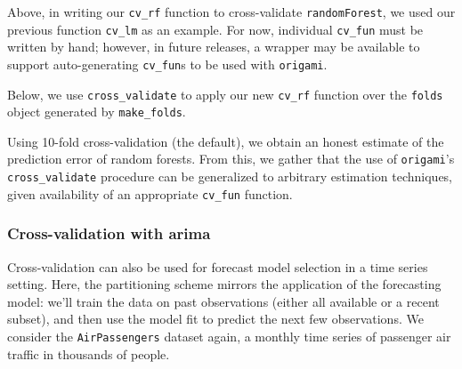\documentclass[12pt, krantz2,]{krantz}
\newenvironment{Shaded}{\begin{snugshade}}{\end{snugshade}}
\newcommand{\CommentTok}[1]{\textcolor[rgb]{0.37,0.37,0.37}{\textit{#1}}}
\newcommand{\DataTypeTok}[1]{\textcolor[rgb]{0.27,0.27,0.27}{#1}}
\newcommand{\KeywordTok}[1]{\textcolor[rgb]{0.27,0.27,0.27}{\textbf{#1}}}
\newcommand{\NormalTok}[1]{#1}
\newcommand{\OperatorTok}[1]{\textcolor[rgb]{0.43,0.43,0.43}{\textbf{#1}}}
\newcommand{\OtherTok}[1]{\textcolor[rgb]{0.37,0.37,0.37}{#1}}
\newcommand{\StringTok}[1]{\textcolor[rgb]{0.5,0.5,0.5}{#1}}
\theoremstyle{definition}
\theoremstyle{definition}
\theoremstyle{definition}
\newcommand{\1}{\mathbbm{1}}
\begin{document}
Above, in writing our \texttt{cv\_rf} function to cross-validate \texttt{randomForest}, we used
our previous function \texttt{cv\_lm} as an example. For now, individual \texttt{cv\_fun} must
be written by hand; however, in future releases, a wrapper may be available to
support auto-generating \texttt{cv\_fun}s to be used with \texttt{origami}.

Below, we use \texttt{cross\_validate} to apply our new \texttt{cv\_rf} function over the \texttt{folds}
object generated by \texttt{make\_folds}.

\begin{Shaded}
\end{Shaded}

Using 10-fold cross-validation (the default), we obtain an honest estimate of
the prediction error of random forests. From this, we gather that the use of
\texttt{origami}'s \texttt{cross\_validate} procedure can be generalized to arbitrary estimation
techniques, given availability of an appropriate \texttt{cv\_fun} function.

\hypertarget{cross-validation-with-arima}{%
\subsubsection{Cross-validation with arima}\label{cross-validation-with-arima}}

Cross-validation can also be used for forecast model selection in a time series
setting. Here, the partitioning scheme mirrors the application of the
forecasting model: we'll train the data on past observations (either all
available or a recent subset), and then use the model fit to predict the next
few observations. We consider the \texttt{AirPassengers} dataset again, a monthly time
series of passenger air traffic in thousands of people.
\end{document}
